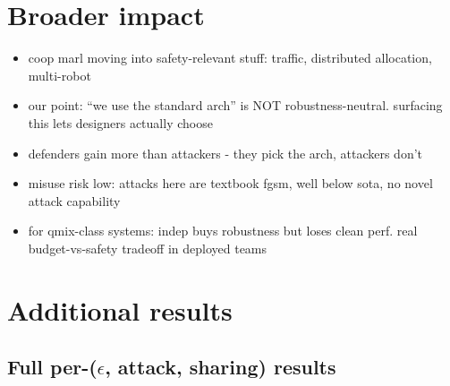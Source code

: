 \documentclass{article}
\begin{document}
\section*{Broader impact}

\begin{itemize}
  \item coop marl moving into safety-relevant stuff: traffic, distributed allocation, multi-robot
  \item our point: ``we use the standard arch'' is NOT robustness-neutral. surfacing this lets designers actually choose
  \item defenders gain more than attackers - they pick the arch, attackers don't
  \item misuse risk low: attacks here are textbook fgsm, well below sota, no novel attack capability
  \item for qmix-class systems: indep buys robustness but loses clean perf. real budget-vs-safety tradeoff in deployed teams
\end{itemize}






\appendix

\section{Additional results}

\subsection{Full per-($\epsilon$, attack, sharing) results}
\label{app:full-results}

\begin{table}[H]
\centering
\scriptsize
\setlength{\tabcolsep}{3pt}

\caption{Mean test return $\pm$ SEM over 3 seeds ($n_{\mathrm{episodes}}=100$ each) for every (algorithm, sharing, attack, $\epsilon$) cell on MPE \texttt{simple\_spread}. Per-seed values available in \texttt{figures/aggregate.json}.}
\label{tab:appendix-full}
\end{table}
\end{document}
